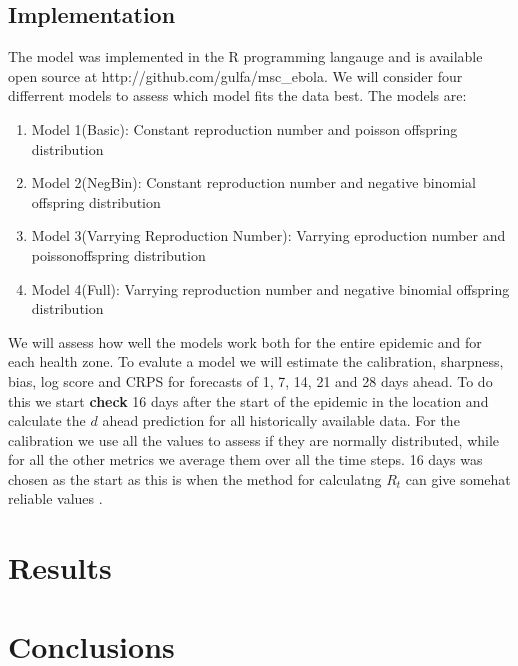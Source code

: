 \documentclass[12pt]{article}
\begin{document}
\subsection{Implementation}
The model was implemented in the R programming langauge \cite{rcoreteamLanguageEnvironmentStatistical2018} and is available open source at http://github.com/gulfa/msc\_ebola. We will consider four differrent models to assess which model fits the data best. The models are:

\begin{enumerate}
\item{Model 1(Basic): Constant reproduction number and poisson offspring distribution}
\item{Model 2(NegBin): Constant reproduction number and negative binomial offspring distribution}
\item{Model 3(Varrying Reproduction Number): Varrying eproduction number and poissonoffspring distribution}
\item{Model 4(Full): Varrying reproduction number and negative binomial offspring distribution}
\end{enumerate}

We will assess how well the models work both for the entire epidemic and for each health zone. To evalute a model we will estimate the calibration, sharpness, bias, log score and CRPS for forecasts of 1, 7, 14, 21 and 28 days ahead. To do this we start { \bf check } 16 days after the start of the epidemic in the location and calculate the $d$ ahead prediction for all historically available data. For the calibration we use all the values to assess if they are normally distributed, while for all the other metrics we average them over all the time steps. 16 days was chosen as the start as this is when the method for calculatng $R_t$ can give somehat reliable values \cite{coriNewFrameworkSoftware2013}. 



\section{Results}

\section{Conclusions}

\newpage

 

\end{document}
